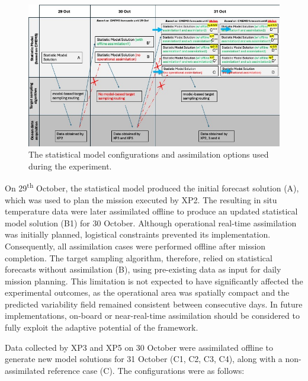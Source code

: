 \begin{figure}
    \centering
    \includegraphics[scale=0.6]{fig/model-config.jpeg}
    \caption{The statistical model configurations and assimilation
      options used during the \proj experiment.}
    \label{fig:model-config}
\end{figure}


On 29\textsuperscript{th} October, the statistical model produced the
initial forecast solution (A), which was used to plan the mission
executed by XP2. The resulting in situ temperature data were later
assimilated offline to produce an updated statistical model solution
(B1) for 30 October. Although operational real-time assimilation was
initially planned, logistical constraints prevented its
implementation. Consequently, all assimilation cases were performed
offline after mission completion. The target sampling algorithm,
therefore, relied on statistical forecasts without assimilation (B),
using pre-existing data as input for daily mission planning. This
limitation is not expected to have significantly affected the
experimental outcomes, as the operational area was spatially compact
and the predicted variability field remained consistent between
consecutive days. In future implementations, on-board or
near-real-time assimilation should be considered to fully exploit the
adaptive potential of the framework.

Data collected by XP3 and XP5 on 30 October were assimilated offline
to generate new model solutions for 31 October (C1, C2, C3, C4), along
with a non-assimilated reference case (C). The configurations were as
follows:

